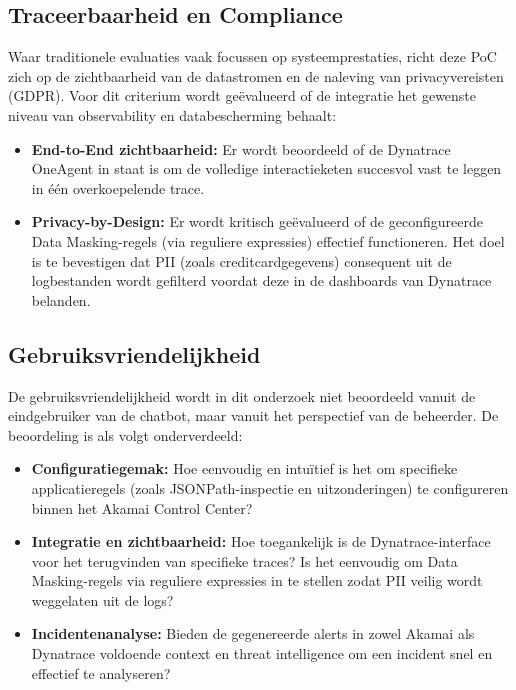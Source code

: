 \subsection{Traceerbaarheid en Compliance}

Waar traditionele evaluaties vaak focussen op systeemprestaties, richt deze PoC zich op de zichtbaarheid van de datastromen en de naleving van privacyvereisten (GDPR). Voor dit criterium wordt geëvalueerd of de integratie het gewenste niveau van observability en databescherming behaalt:

\begin{itemize}
    \item \textbf{End-to-End zichtbaarheid:} Er wordt beoordeeld of de Dynatrace OneAgent in staat is om de volledige interactieketen succesvol vast te leggen in één overkoepelende trace.
    
    \item \textbf{Privacy-by-Design:} Er wordt kritisch geëvalueerd of de geconfigureerde Data Masking-regels (via reguliere expressies) effectief functioneren. Het doel is te bevestigen dat PII (zoals creditcardgegevens) consequent uit de logbestanden wordt gefilterd voordat deze in de dashboards van Dynatrace belanden.
\end{itemize}

\subsection{Gebruiksvriendelijkheid}

De gebruiksvriendelijkheid wordt in dit onderzoek niet beoordeeld vanuit de eindgebruiker van de chatbot, maar vanuit het perspectief van de beheerder. De beoordeling is als volgt onderverdeeld:

\begin{itemize}
    \item \textbf{Configuratiegemak:} Hoe eenvoudig en intuïtief is het om specifieke applicatieregels (zoals JSONPath-inspectie en uitzonderingen) te configureren binnen het Akamai Control Center?
    
    \item \textbf{Integratie en zichtbaarheid:} Hoe toegankelijk is de Dynatrace-interface voor het terugvinden van specifieke traces? Is het eenvoudig om Data Masking-regels via reguliere expressies in te stellen zodat PII veilig wordt weggelaten uit de logs?
    
    \item \textbf{Incidentenanalyse:} Bieden de gegenereerde alerts in zowel Akamai als Dynatrace voldoende context en threat intelligence om een incident snel en effectief te analyseren?
\end{itemize}